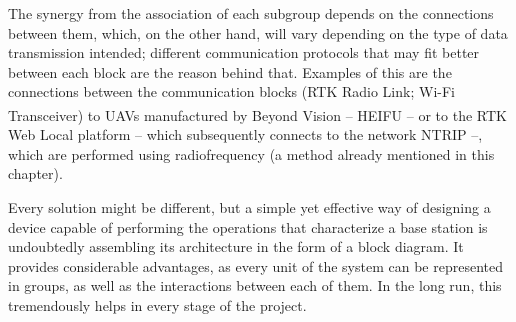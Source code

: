 The synergy from the association of each subgroup depends on the connections between them, which, on the other hand, will vary depending on the type of data transmission intended; different communication protocols that may fit better between each block are the reason behind that. Examples of this are the connections between the communication blocks (RTK Radio Link; Wi-Fi Transceiver) to UAVs manufactured by Beyond Vision -- HEIFU\textsuperscript{\textregistered} -- or to the RTK Web Local platform -- which subsequently connects to the network NTRIP --, which are performed using radiofrequency (a method already mentioned in this chapter).

Every solution might be different, but a simple yet effective way of designing a device capable of performing the operations that characterize a base station is undoubtedly assembling its architecture in the form of a block diagram. It provides considerable advantages, as every unit of the system can be represented in groups, as well as the interactions between each of them. In the long run, this tremendously helps in every stage of the project.
